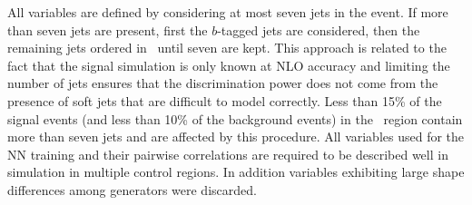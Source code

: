 All variables are defined by considering at most seven jets in the event. If more than seven jets are present, first the $b$-tagged jets are considered,
then the remaining jets ordered in \pT\ until seven are kept. This approach is related to the fact that the signal simulation is only known at NLO accuracy 
and limiting the number of jets ensures that the discrimination power does not come from the presence of soft jets that are difficult to model correctly. 
Less than 15\% of the signal events (and less than 10\% of the background events) in the \sixfour\ region contain more than seven jets and are affected by this procedure.
All variables used for the NN training
and their pairwise correlations are required to be described well in simulation in multiple control regions. 
In addition variables exhibiting large shape differences among generators were discarded.


